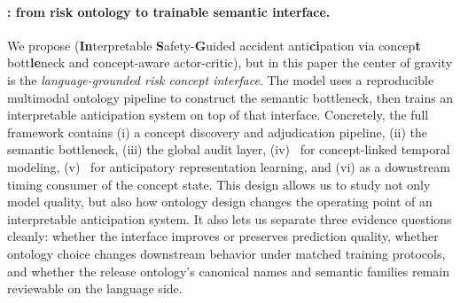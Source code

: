 \paragraph{\method{}: from risk ontology to trainable semantic interface.}
We propose \method{} (\textbf{In}terpretable \textbf{S}afety-\textbf{G}uided
accident anti\textbf{ci}pation via concep\textbf{t} bott\textbf{le}neck and
concept-aware actor-critic), but in this paper the center of gravity is
the \emph{language-grounded risk concept interface}. The model uses a
reproducible multimodal ontology pipeline to construct the semantic bottleneck,
then trains an interpretable anticipation system on top of that interface.
Concretely, the full framework contains
(i) a concept discovery and adjudication pipeline,
(ii) the \cbm{} semantic bottleneck,
(iii) the global \crs{} audit layer,
(iv)~\cgta{} for concept-linked temporal modeling,
(v)~\tsd{} for anticipatory representation learning, and
(vi) \caac{} as a downstream timing consumer of the concept state.
This design allows us to study not only model quality, but also how ontology
design changes the operating point of an interpretable anticipation system.
It also lets us separate three evidence questions cleanly: whether the
interface improves or preserves prediction quality, whether ontology choice
changes downstream behavior under matched training protocols, and whether the
release ontology's
canonical names and semantic families remain reviewable on the language side.

